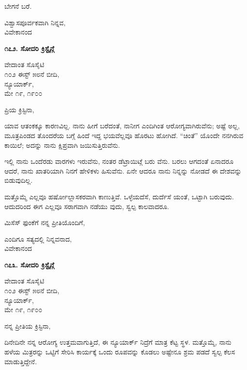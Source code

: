 ಬೇಗನೆ ಬರೆ.

\begin{flushright}
ವಿಶ್ವಾಸಪೂರ್ವಕವಾಗಿ ನಿನ್ನವ,\\ವಿವೇಕಾನಂದ
\end{flushright}

\begin{center}
\textbf{೧೭೨. ಸೋದರಿ ಕ್ರಿಸ್ಟೈನ್ಗೆ}
\end{center}

\begin{flushright}
ವೇದಾಂತ ಸೊಸೈಟಿ\\೧೦೨ ಈಸ್ಟ್ ೫೮ನೆ ಬೀದಿ,\\ನ್ಯೂಯಾರ್ಕ್,\\ಮೇ ೧೯, ೧೯೦೦
\end{flushright}

ಪ್ರಿಯ ಕ್ರಿಸ್ಟಿನಾ,

ಯಾವ ಆತಂಕಕ್ಕೂ ಕಾರಣವಿಲ್ಲ. ನಾನು ಹೀಗೆ ಬರೆದಂತೆ, ನಾನೀಗ ಎಂದಿಗಿಂತ ಆರೋಗ್ಯವಾಗಿರುವೆನು; ಅಷ್ಟೆ ಅಲ್ಲ, ಮೂತ್ರಪಿಂಡದ ತೊಂದರೆಯ ಬಗ್ಗೆ ಹಿಂದೆ ಇದ್ದ ಭಯವೆಲ್ಲವೂ ಹೊರಟು ಹೋಗಿದೆ. “ಚಿಂತೆ” ಯೊಂದೇ ನನಗಿರುವ ಕಾಯಿಲೆ; ಅದನ್ನು ನಾನು ಕ್ಷಿಪ್ರವಾಗಿ ಜಯಿಸುತ್ತಿರುವೆನು.

ಇಲ್ಲಿ ನಾನು ಒಂದೆರಡು ವಾರಗಳು ಇರುವೆನು, ನಂತರ ಡೆಟ್ರಾಯಿಟ್ಗೆ ಬರು ವೆನು. ಬರಲು ಆಗದಂತೆ ಏನಾದರೂ ಆದರೆ, ನಾನು ಖಾತರಿಯಾಗಿ ನಿನಗೆ ಹೇಳಿಕಳು ಹಿಸುವೆನು. ಏನೇ ಆದರೂ ನಾನು ನಿನ್ನನ್ನು ನೋಡದೆ ಈ ದೇಶವನ್ನು ಬಿಡುವುದಿಲ್ಲ.

ಮತ್ತೊಮ್ಮೆ ಎಲ್ಲವೂ ಹರ್ಷೋಲ್ಲಾಸಕರವಾಗಿ ಕಾಣುತ್ತಿವೆ. ಒಳ್ಳೆಯದೆಸೆ, ದುರ್ದೆಸೆ ಯಂತೆ, ಒಟ್ಟಾಗಿ ಬರುವುದು. ಆದುದರಿಂದ ಈಗ ಎಲ್ಲವೂ ಸರಾಗವಾಗಿ ನಡೆಯು ವುದು, ಸ್ವಲ್ಪ ಕಾಲವಾದರೂ.

ಮಿಸೆಸ್ ಫುಂಕೆಗೆ ನನ್ನ ಪ್ರೀತಿಯೊಂದಿಗೆ,

\begin{flushright}
ಎಂದಿಗೂ ಸತ್ಯದಲ್ಲಿ ನಿನ್ನವನಾದ,\\ವಿವೇಕಾನಂದ
\end{flushright}

\begin{center}
\textbf{೧೭೩. ಸೋದರಿ ಕ್ರಿಸ್ಟೈನ್ಗೆ}
\end{center}

\begin{flushright}
ವೇದಾಂತ ಸೊಸೈಟಿ\\೧೦೨ ಈಸ್ಟ್ ೫೮ನೆ ಬೀದಿ,\\ನ್ಯೂಯಾರ್ಕ್,\\ಮೇ ೧೯, ೧೯೦೦
\end{flushright}

ನನ್ನ ಪ್ರೀತಿಯ ಕ್ರಿಸ್ಟಿನಾ,

ದಿನೇದಿನೇ ನನ್ನ ಆರೋಗ್ಯ ಉತ್ತಮವಾಗುತ್ತಿದೆ, ಈ ನ್ಯೂಯಾರ್ಕ್ ನಿದ್ರೆಗೆ ಮಾತ್ರ ಕೆಟ್ಟ ಸ್ಥಳ. ಮತ್ತೊಮ್ಮೆ, ನಾನು ಹಳೆಯ ಮಿತ್ರರನ್ನು ಒಟ್ಟಿಗೆ ಸೇರಿಸಿ ಕಾರ್ಯಕ್ಕೆ ಒಂದು ರೂಪವನ್ನು ಕೊಡಲು ಅಷ್ಟೇನೂ ಶ್ರಮ ಪಡದೆ ಸ್ವಲ್ಪ ಕೆಲಸ ಮಾಡುತ್ತಿದ್ದೇನೆ.

